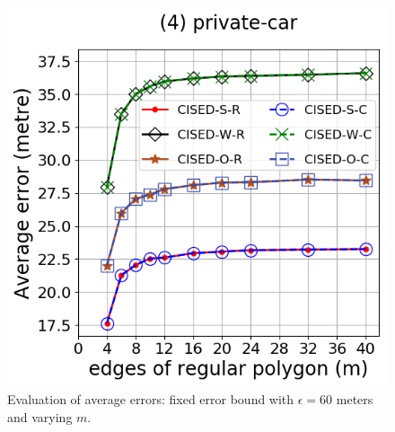 \begin{figure}[tb!]
	\includegraphics[scale = 0.30]{Figures/Exp-M-e-60-error-private.png}
	\caption{\small Evaluation of average errors: fixed error bound with $\epsilon = 60$ meters and varying $m$.}
	\label{fig:m-error-e60}
\end{figure}


